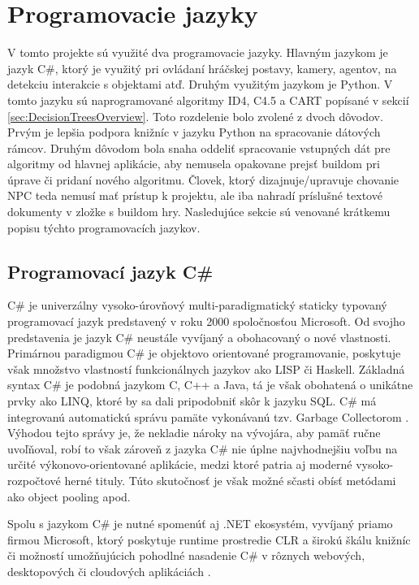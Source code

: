 \documentclass[slovak, master]{diploma}
\begin{document}
\section{Programovacie jazyky}
\label{sec:langs}
V tomto projekte sú využité dva programovacie jazyky. Hlavným jazykom je jazyk C\#, ktorý je využitý pri ovládaní hráčskej postavy, kamery, agentov, na detekciu interakcie s objektami atď. Druhým využitým jazykom je Python. V tomto jazyku sú naprogramované algoritmy ID4, C4.5 a CART popísané v sekcií \ref{sec:DecisionTreesOverview}. Toto rozdelenie bolo zvolené z dvoch dôvodov. Prvým je lepšia podpora knižníc v jazyku Python na spracovanie dátových rámcov. Druhým dôvodom bola snaha oddeliť spracovanie vstupných dát pre algoritmy od hlavnej aplikácie, aby nemusela opakovane prejsť buildom pri úprave či pridaní nového algoritmu. Človek, ktorý dizajnuje/upravuje chovanie NPC teda nemusí mať prístup k projektu, ale iba nahradí príslušné textové dokumenty v zložke s buildom hry. Nasledujúce sekcie sú venované krátkemu popisu týchto programovacích jazykov.

\subsection{Programovací jazyk C\#}
\label{sec:langsCShartp}
C\# je univerzálny vysoko-úrovňový multi-paradigmatický staticky typovaný programovací jazyk predstavený v roku 2000 spoločnosťou Microsoft. Od svojho predstavenia je jazyk C\# neustále vyvíjaný a obohacovaný o nové vlastnosti. Primárnou paradigmou C\# je objektovo orientované programovanie, poskytuje však množstvo vlastností funkcionálnych jazykov ako LISP či Haskell. Základná syntax C\# je podobná jazykom C, C++ a Java, tá je však obohatená o unikátne prvky ako LINQ, ktoré by sa dali pripodobniť skôr k jazyku SQL. C\# má integrovanú automatickú správu pamäte vykonávanú tzv. Garbage Collectorom \cite{DotNetBook}. Výhodou tejto správy je, že nekladie nároky na vývojára, aby pamäť ručne uvoľňoval, robí to však zároveň z jazyka C\# nie úplne najvhodnejšiu voľbu na určité výkonovo-orientované aplikácie, medzi ktoré patria aj moderné vysoko-rozpočtové herné tituly. Túto skutočnosť je však možné sčasti obísť metódami ako object pooling apod.

Spolu s jazykom C\# je nutné spomenúť aj .NET ekosystém, vyvíjaný priamo firmou Microsoft, ktorý poskytuje runtime prostredie CLR a širokú škálu knižníc či možností umožňujúcich pohodlné nasadenie C\# v rôznych webových, desktopových či cloudových aplikáciách \cite{DotNetBook}.
\end{document}

